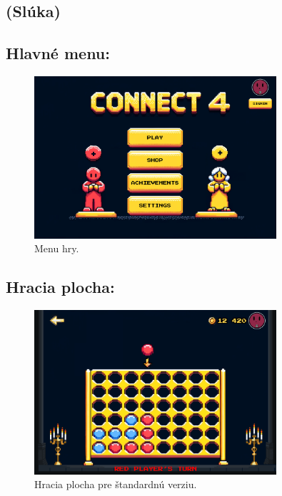 \documentclass[a4paper, 11pt, onecolumn]{article}
\begin{document}
\subsection{(Slúka)}

\subsection*{Hlavné menu:}
\begin{figure}[H]
  \centering
  \includegraphics[width=0.8\textwidth]{Menu.png}
  \caption{ Menu hry.}
  \label{fig:menu_label}
\end{figure}

\subsection*{Hracia plocha:}
\begin{figure}[H]
  \centering
  \includegraphics[width=0.8\textwidth]{Plocha.png}
  \caption{ Hracia plocha pre štandardnú verziu.}
  \label{fig:štandard_label}
\end{figure}
\end{document}
